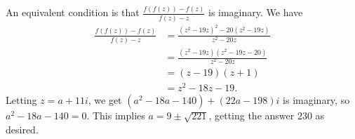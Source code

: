 An equivalent condition is that $\frac{f\left(f\left(z\right)\right)-f\left(z\right)}{f\left(z\right)-z}$ is imaginary. We have
\begin{align*}
	\frac{f\left(f\left(z\right)\right)-f\left(z\right)}{f\left(z\right)-z}
	&=\frac{\left(z^2-19z\right)^2-20\left(z^2-19z\right)}{z^2-20z}\\
	&=\frac{\left(z^2-19z\right)\left(z^2-19z-20\right)}{z^2-20z}\\
	&=\left(z-19\right)\left(z+1\right)\\
	&=z^2-18z-19.
\end{align*}
Letting $z=a+11i$, we get $\left(a^2-18a-140\right)+\left(22a-198\right)i$ is imaginary, so $a^2-18a-140=0$. This implies $a=9\pm\sqrt{221}$, getting the answer $\boxed{230}$ as desired.